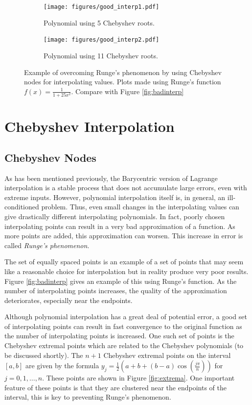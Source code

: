 \begin{figure}[H]
\captionsetup[subfigure]{justification=centering}
\captionsetup{justification=centering}
\centering
\begin{subfigure}{.5\textwidth}
    \centering
    \texttt{[image: figures/good\_interp1.pdf]}
    \caption{Polynomial using 5 Chebyshev roots.}
    \label{fig:good1}
\end{subfigure}%
\begin{subfigure}{.5\textwidth}
    \centering
    \texttt{[image: figures/good\_interp2.pdf]}
    \caption{Polynomial using 11 Chebyshev roots.}
    \label{fig:good2}
\end{subfigure}
\caption{Example of overcoming Runge's phenomenon by using Chebyshev nodes for interpolating values.
Plots made using Runge's function $f(x)=\frac{1}{1+25x^2}$.
Compare with Figure \ref{fig:badinterp}}
\label{fig:goodinterp}
\end{figure}

\section*{Chebyshev Interpolation}
\subsection*{Chebyshev Nodes}
As has been mentioned previously, the Barycentric version of Lagrange interpolation is a stable process that does not accumulate large errors, even with extreme inputs.
However, polynomial interpolation itself is, in general, an ill-conditioned problem.
Thus, even small changes in the interpolating values can give drastically different interpolating polynomials.
In fact, poorly chosen interpolating points can result in a very bad approximation of a function.
As more points are added, this approximation can worsen.
This increase in error is called \emph{Runge's phenomenon}.

The set of equally spaced points is an example of a set of points that may seem like a reasonable choice for interpolation but in reality produce very poor results.
Figure \ref{fig:badinterp} gives an example of this using Runge's function.
As the number of interpolating points increases, the quality of the approximation deteriorates, especially near the endpoints.

Although polynomial interpolation has a great deal of potential error, a good set of interpolating points can result in fast convergence to the original function as the number of interpolating points is increased.
One such set of points is the Chebyshev extremal points which are related to the Chebyshev polynomials (to be discussed shortly).
The $n+1$ Chebyshev extremal points on the interval $[a,b]$ are given by the formula $y_j=\frac{1}{2}(a+b + (b-a)\cos(\frac{j\pi}{n}))$ for $j=0,1,\dots,n$.
These points are shown in Figure \ref{fig:extrema}.
One important feature of these points is that they are clustered near the endpoints of the interval, this is key to preventing Runge's phenomenon.

